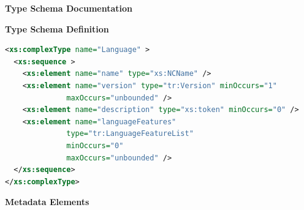 \documentclass{ivoa}
\begin{document}
\begingroup
      	\renewcommand*\descriptionlabel[1]{%
      	\hbox to 5.5em{\emph{#1}\hfil}}
      	\vspace{2ex}\noindent\textbf{ Type Schema Documentation}



\vspace{1ex}\noindent\textbf{ Type Schema Definition}

\begin{lstlisting}[language=XML,basicstyle=\footnotesize]
<xs:complexType name="Language" >
  <xs:sequence >
    <xs:element name="name" type="xs:NCName" />
    <xs:element name="version" type="tr:Version" minOccurs="1"
              maxOccurs="unbounded" />
    <xs:element name="description" type="xs:token" minOccurs="0" />
    <xs:element name="languageFeatures"
              type="tr:LanguageFeatureList"
              minOccurs="0"
              maxOccurs="unbounded" />
  </xs:sequence>
</xs:complexType>
\end{lstlisting}

\vspace{0.5ex}\noindent\textbf{ Metadata Elements}
\end{document}
